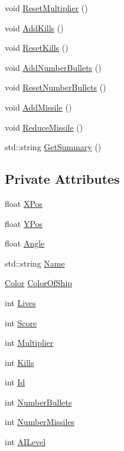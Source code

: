 \begin{DoxyCompactItemize}
\item 
void \hyperlink{classShip_ade17db06c7268be06f76a652d6071eae}{Reset\-Multiplier} ()
\item 
void \hyperlink{classShip_ab5c106a5a4dc1611170b3ec0a7c10b3a}{Add\-Kills} ()
\item 
void \hyperlink{classShip_af08c10afb76fb3c0f96e6c8f26e9c536}{Reset\-Kills} ()
\item 
void \hyperlink{classShip_ad647ae87f5745552f4c0f29abdb40a03}{Add\-Number\-Bullets} ()
\item 
void \hyperlink{classShip_a74359ab9ec67a94a00090d4e27e2d6f0}{Reset\-Number\-Bullets} ()
\item 
void \hyperlink{classShip_a4e5d0077da3062e6ef260d7917823d33}{Add\-Missile} ()
\item 
void \hyperlink{classShip_afd1a875e03e082907b3d8fe80283a096}{Reduce\-Missile} ()
\item 
std\-::string \hyperlink{classShip_aa3a10aab791434650749c8c6d435d922}{Get\-Summary} ()
\end{DoxyCompactItemize}
\subsection*{Private Attributes}
\begin{DoxyCompactItemize}
\item 
float \hyperlink{classShip_a6549912d1c63b46eb331aca1cf9adea1}{X\-Pos}
\item 
float \hyperlink{classShip_a66b847cf1abf5b0102dc769949543322}{Y\-Pos}
\item 
float \hyperlink{classShip_a4331a7a2e097b2159c526c574823d140}{Angle}
\item 
std\-::string \hyperlink{classShip_a5c247c8fa3b3781733d80ba4afba7eea}{Name}
\item 
\hyperlink{classColor}{Color} \hyperlink{classShip_a2c537196cae0ce94a0d21f28299039b0}{Color\-Of\-Ship}
\item 
int \hyperlink{classShip_a4a11447f6505ad41ff6ab9cd7b1f55bc}{Lives}
\item 
int \hyperlink{classShip_abf2e70f207f8abcec0428b7a12ede9f1}{Score}
\item 
int \hyperlink{classShip_a50df120a6410a570b8e5aef1578340cd}{Multiplier}
\item 
int \hyperlink{classShip_afdb54a112d7d34efda452155c8e84669}{Kills}
\item 
int \hyperlink{classShip_ac48474a3bbe753d862ad7074d2ba9981}{Id}
\item 
int \hyperlink{classShip_a37320083d8bab0468569c3e115db262f}{Number\-Bullets}
\item 
int \hyperlink{classShip_ab24237be38864d5a3d6ffad7b4d9925b}{Number\-Missiles}
\item 
int \hyperlink{classShip_aeb9c8e01a6dd8f6d5a0a9ec7a65a1056}{A\-I\-Level}
\end{DoxyCompactItemize}


